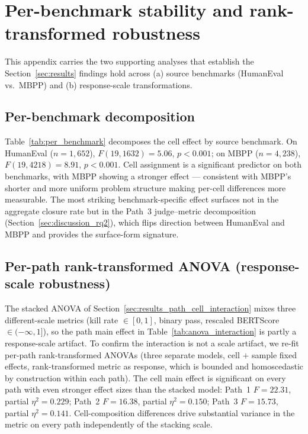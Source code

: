 \section{Per-benchmark stability and rank-transformed robustness}
\label{sec:appendix_stability}

This appendix carries the two supporting analyses that establish the
Section~\ref{sec:results} findings hold across (a) source benchmarks
(HumanEval vs.\ MBPP) and (b) response-scale transformations.

\subsection{Per-benchmark decomposition}
\label{sec:appendix_per_benchmark}
\label{sec:results_per_benchmark_decomp}



Table~\ref{tab:per_benchmark} decomposes the cell effect by source
benchmark. On HumanEval ($n = 1{,}652$), $F(19, 1632) = 5.06$,
$p < 0.001$; on MBPP ($n = 4{,}238$), $F(19, 4218) = 8.91$, $p < 0.001$.
Cell assignment is a significant predictor on both benchmarks, with
MBPP showing a stronger effect --- consistent with MBPP's shorter and
more uniform problem structure making per-cell differences more
measurable. The most striking benchmark-specific effect surfaces not
in the aggregate closure rate but in the Path~3 judge--metric
decomposition (Section~\ref{sec:discussion_rq2}), which flips
direction between HumanEval and MBPP and provides the surface-form
signature.

\subsection{Per-path rank-transformed ANOVA (response-scale robustness)}
\label{sec:appendix_rank_transformed}

The stacked ANOVA of Section~\ref{sec:results_path_cell_interaction}
mixes three different-scale metrics (kill rate $\in [0, 1]$, binary
pass, rescaled BERTScore $\in (-\infty, 1]$), so the path main effect
in Table~\ref{tab:anova_interaction} is partly a response-scale
artifact. To confirm the interaction is not a scale artifact, we
re-fit per-path rank-transformed ANOVAs (three separate models, cell
$+$ sample fixed effects, rank-transformed metric as response, which
is bounded and homoscedastic by construction within each path). The
cell main effect is significant on every path with even stronger
effect sizes than the stacked model: Path~1 $F = 22.31$, partial
$\eta^2 = 0.229$; Path~2 $F = 16.38$, partial $\eta^2 = 0.150$;
Path~3 $F = 15.73$, partial $\eta^2 = 0.141$. Cell-composition
differences drive substantial variance in the metric on every path
independently of the stacking scale.
